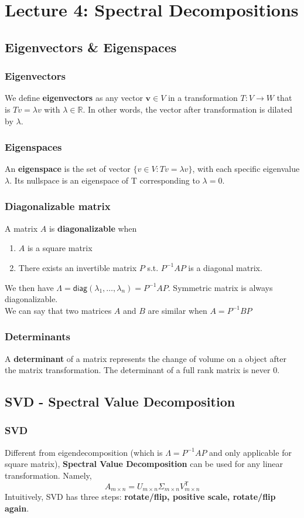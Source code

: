 \documentclass[12pt]{article}
\begin{document}
\section*{Lecture 4: Spectral Decompositions}
\subsection*{Eigenvectors \& Eigenspaces}
\subsubsection*{Eigenvectors}
We define \textbf{eigenvectors} as any vector $\textbf{v} \in V$ in a transformation $T: V \rightarrow W$ that is $Tv = \lambda v$ with $\lambda \in \mathbb{R}$. In other words, the vector after transformation is dilated by $\lambda$.
\subsubsection*{Eigenspaces}
An \textbf{eigenspace} is the set of vector $\{v \in V: Tv = \lambda v\}$, with each specific eigenvalue $\lambda$. Its nullspace is an eigenspace of T corresponding to $\lambda = 0 $.
\subsubsection*{Diagonalizable matrix}
A matrix $A$ is \textbf{diagonalizable} when
\begin{enumerate}
\item $A$ is a square matrix
\item There exists an invertible matrix $P$ s.t. $P^{-1}AP$ is a diagonal matrix.
\end{enumerate}
We then have $\Lambda = \textsf{diag}(\lambda_1,\ldots,\lambda_n) = P^{-1}AP $. Symmetric matrix is always diagonalizable.\\
We can say that two matrices $A$ and $B$ are similar when $A = P^{-1}BP$
\subsubsection*{Determinants}
A \textbf{determinant} of a matrix represents the change of volume on a object after the matrix transformation. The determinant of a full rank matrix is never 0.
\subsection*{SVD - Spectral Value Decomposition}
\subsubsection*{SVD}
Different from eigendecomposition (which is $\Lambda = P^{-1}AP$ and only applicable for square matrix), \textbf{Spectral Value Decomposition} can be used for any linear transformation. Namely,
$$A_{m\times n} = U_{m \times n} \Sigma_{m \times n} V_{m \times n}^\textsf{T} $$
Intuitively, SVD has three steps: \textbf{rotate/flip, positive scale, rotate/flip again}.
\end{document}
